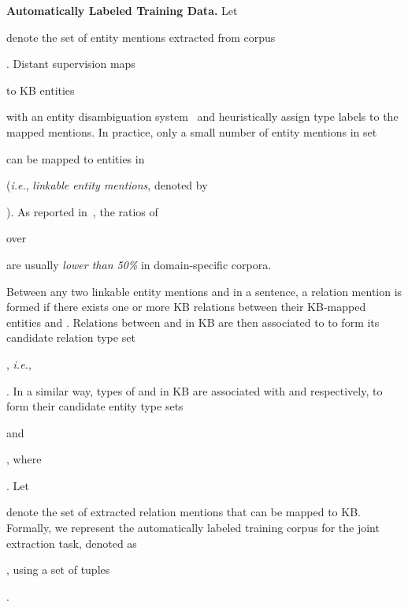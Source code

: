 \documentclass[letterpaper]{sig-alternate-2013}
\def\ie{{\sl i.e.}}
\begin{document}
\smallskip\noindent
\textbf{\small \textsf{Automatically Labeled Training Data.}}
Let \begin{small}\end{small} denote the set of entity mentions extracted from corpus \begin{small}\end{small}. Distant supervision maps \begin{small}\end{small} to KB entities \begin{small}\end{small} with an entity disambiguation system~\cite{mendes2011dbpedia,hoffart2011robust} and heuristically assign type labels to the mapped mentions. In practice, only a small number of entity mentions in set \begin{small}\end{small} can be mapped to entities in \begin{small}\end{small} (\ie, \textit{linkable entity mentions}, denoted by \begin{small}\end{small}). As reported in~\cite{ren2015clustype,lin2012no}, the ratios of \begin{small}\end{small} over \begin{small}\end{small} are usually \textit{lower than 50\%} in domain-specific corpora.

Between any two linkable entity mentions  and  in a sentence, a relation mention  is formed if there exists one or more KB relations between their KB-mapped entities  and . Relations between  and  in KB are then associated to  to form its candidate relation type set \begin{small}\end{small}, \ie, \begin{small}\end{small}.
In a similar way, types of  and  in KB are associated with  and  respectively, to form their candidate entity type sets \begin{small}\end{small} and \begin{small}\end{small}, where \begin{small}\end{small}.
Let \begin{small}\end{small} denote the set of extracted relation mentions that can be mapped to KB.
Formally, we represent the automatically labeled training corpus for the joint extraction task, denoted as \begin{small}\end{small}, using a set of tuples \begin{small}\end{small}.
\end{document}

